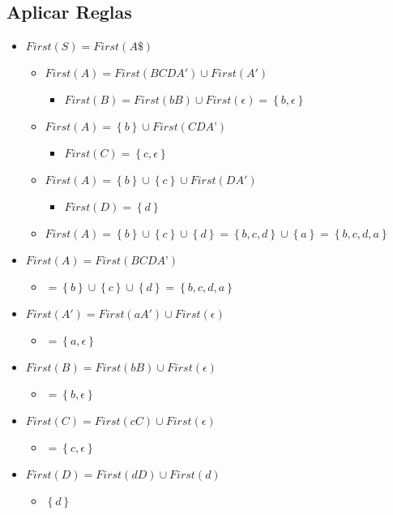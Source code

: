 \documentclass[10pt]{article}
\begin{document}
\subsection{Aplicar Reglas}
\begin{itemize}
    \item $First (S) = First (A\$)$
    \begin{itemize}
        \item $First (A) = First (BCDA') \cup First (A')$
     \begin{itemize}
         \item $First (B) = First (bB) \cup First (\epsilon) = \left \{ b, \epsilon \right \}$
     \end{itemize}
        \item $First (A) = \left \{b  \right \} \cup First (CDA’)$
        \begin{itemize}
            \item $First (C) = \left \{c, \epsilon \right \}$
        \end{itemize}
        \item $First (A) = \left \{b  \right \} \cup \left \{c  \right \} \cup First (DA')$
        \begin{itemize}
            \item $First (D) = \left \{d  \right \}$
        \end{itemize}
        \item $First (A) = \left \{b  \right \} \cup \left \{c  \right \} \cup \left \{d \right \} = \left \{b, c, d  \right \} \cup \left \{ a \right \} = \left \{b, c, d, a  \right \}$
    \end{itemize}
    \item $First (A) = First (BCDA’)$
    \begin{itemize}
        \item $= \left \{b  \right \} \cup \left \{c  \right \} \cup \left \{d \right \} = \left \{b, c, d, a  \right \}$
    \end{itemize}
    \item $First (A') = First(aA') \cup First(\epsilon)$
    \begin{itemize}
        \item $= \left \{a, \epsilon  \right \}$
    \end{itemize}
    \item $First (B) = First (bB) \cup First (\epsilon) $
    \begin{itemize}
        \item $= \left \{b, \epsilon  \right \}$
    \end{itemize}
    \item $First (C) = First (cC) \cup First (\epsilon)$
    \begin{itemize}
        \item $= \left \{c, \epsilon  \right \}$
    \end{itemize}
    \item $First (D) = First (dD) \cup First (d)$
    \begin{itemize}
        \item $\left \{d  \right \}$
    \end{itemize}
\end{itemize}
\end{document}
